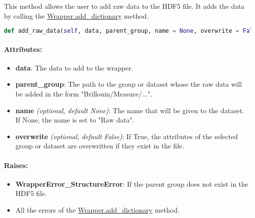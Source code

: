 This method allows the user to add raw data to the HDF5 file. It adds the data by calling the \hyperref[subchapter:wrapper.add_dictionary]{Wrapper.add\_dictionary} method.

\begin{lstlisting}[language=Python]
def add_raw_data(self, data, parent_group, name = None, overwrite = False):
\end{lstlisting}

\paragraph{Attributes:}

\begin{itemize}
    \item \textbf{data}: The data to add to the wrapper. 
    \item \textbf{parent\_group}: The path to the group or dataset whose the raw data will be added in the form "Brillouin/Measure/...".
    \item \textbf{name} \textit{(optional, default None)}: The name that will be given to the dataset. If None, the name is set to "Raw data".
    \item \textbf{overwrite} \textit{(optional, default False)}: If True, the attributes of the selected group or dataset are overwritten if they exist in the file.
\end{itemize}

\paragraph{Raises:}
\begin{itemize}
    \item \textbf{WrapperError\_StructureError}: If the parent group does not exist in the HDF5 file.
    \item All the errors of the \hyperref[subchapter:wrapper.add_dictionary]{Wrapper.add\_dictionary} method.
\end{itemize}

